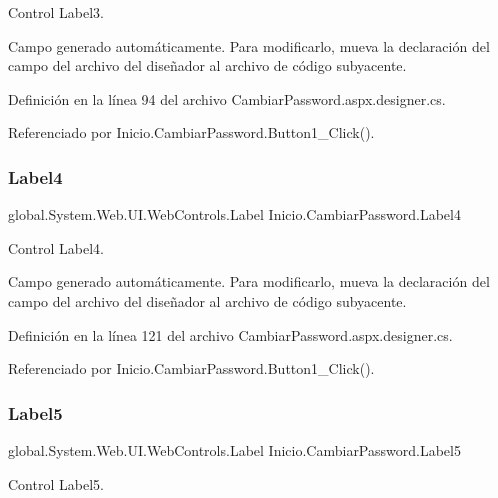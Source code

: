 Control Label3. 

Campo generado automáticamente. Para modificarlo, mueva la declaración del campo del archivo del diseñador al archivo de código subyacente. 

Definición en la línea 94 del archivo Cambiar\+Password.\+aspx.\+designer.\+cs.



Referenciado por Inicio.\+Cambiar\+Password.\+Button1\+\_\+\+Click().

\mbox{\label{classInicio_1_1CambiarPassword_a5c90deffe35773405ff5ec7a875eb035}} 
\subsubsection{\texorpdfstring{Label4}{Label4}}
{\footnotesize\ttfamily global.\+System.\+Web.\+U\+I.\+Web\+Controls.\+Label Inicio.\+Cambiar\+Password.\+Label4\hspace{0.3cm}{\ttfamily [protected]}}



Control Label4. 

Campo generado automáticamente. Para modificarlo, mueva la declaración del campo del archivo del diseñador al archivo de código subyacente. 

Definición en la línea 121 del archivo Cambiar\+Password.\+aspx.\+designer.\+cs.



Referenciado por Inicio.\+Cambiar\+Password.\+Button1\+\_\+\+Click().

\mbox{\label{classInicio_1_1CambiarPassword_adabacc9becc23ab2219428532387a3b0}} 
\subsubsection{\texorpdfstring{Label5}{Label5}}
{\footnotesize\ttfamily global.\+System.\+Web.\+U\+I.\+Web\+Controls.\+Label Inicio.\+Cambiar\+Password.\+Label5\hspace{0.3cm}{\ttfamily [protected]}}



Control Label5. 

